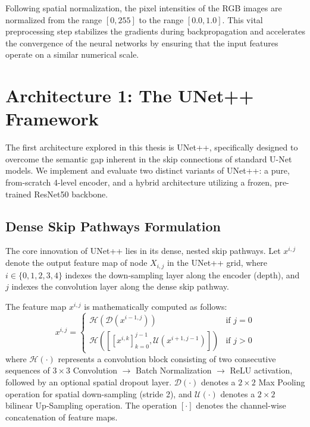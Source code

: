Following spatial normalization, the pixel intensities of the RGB images are normalized from the range $[0, 255]$ to the range $[0.0, 1.0]$. This vital preprocessing step stabilizes the gradients during backpropagation and accelerates the convergence of the neural networks by ensuring that the input features operate on a similar numerical scale.

\section{Architecture 1: The UNet++ Framework}
The first architecture explored in this thesis is UNet++, specifically designed to overcome the semantic gap inherent in the skip connections of standard U-Net models. We implement and evaluate two distinct variants of UNet++: a pure, from-scratch 4-level encoder, and a hybrid architecture utilizing a frozen, pre-trained ResNet50 backbone.

\subsection{Dense Skip Pathways Formulation}
The core innovation of UNet++ lies in its dense, nested skip pathways. Let $x^{i,j}$ denote the output feature map of node $X_{i,j}$ in the UNet++ grid, where $i \in \{0, 1, 2, 3, 4\}$ indexes the down-sampling layer along the encoder (depth), and $j$ indexes the convolution layer along the dense skip pathway.

The feature map $x^{i,j}$ is mathematically computed as follows:
\begin{equation}
    x^{i,j} = \begin{cases}
        \mathcal{H} \left( \mathcal{D}(x^{i-1, j}) \right) & \text{if } j = 0 \\
        \mathcal{H} \left( \left[ \left[ x^{i,k} \right]_{k=0}^{j-1}, \mathcal{U}(x^{i+1, j-1}) \right] \right) & \text{if } j > 0
    \end{cases}
\end{equation}
where $\mathcal{H}(\cdot)$ represents a convolution block consisting of two consecutive sequences of $3 \times 3$ Convolution $\rightarrow$ Batch Normalization $\rightarrow$ ReLU activation, followed by an optional spatial dropout layer. $\mathcal{D}(\cdot)$ denotes a $2 \times 2$ Max Pooling operation for spatial down-sampling (stride 2), and $\mathcal{U}(\cdot)$ denotes a $2 \times 2$ bilinear Up-Sampling operation. The operation $[\cdot]$ denotes the channel-wise concatenation of feature maps.

